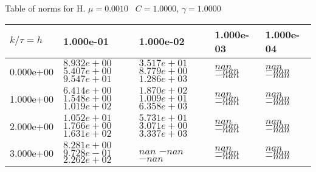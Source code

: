 \begin{center}
Table of norms for H. $\mu = 0.0010$ \, $C = 1.0000$, $\gamma = 1.0000$
  
\begin{tabular}{|p{1in}|p{1in}|p{1in}|p{1in}|p{1in}|} \hline
$k / \tau = h$ &1.000e-01 &1.000e-02 &1.000e-03 &1.000e-04 \\ \hline 
0.000e+00 & $8.932e+00$  $5.407e+00$  $9.547e+01$  & $3.517e+01$  $8.779e+00$  $1.286e+03$  & $nan$  $-nan$  $-nan$  & $nan$  $-nan$  $-nan$  \\ \hline 
1.000e+00 & $6.414e+00$  $1.548e+00$  $1.019e+02$  & $1.870e+02$  $1.009e+01$  $6.358e+03$  & $nan$  $-nan$  $-nan$  & $nan$  $-nan$  $-nan$  \\ \hline 
2.000e+00 & $1.052e+01$  $1.766e+00$  $1.631e+02$  & $5.731e+01$  $3.071e+00$  $3.337e+03$  & $nan$  $-nan$  $-nan$  & $nan$  $-nan$  $-nan$  \\ \hline 
3.000e+00 & $8.281e+00$  $9.728e-01$  $2.262e+02$  & $nan$  $-nan$  $-nan$  & $nan$  $-nan$  $-nan$  & $nan$  $-nan$  $-nan$  \\ \hline 

\end{tabular}\\[20pt]
\end{center}
